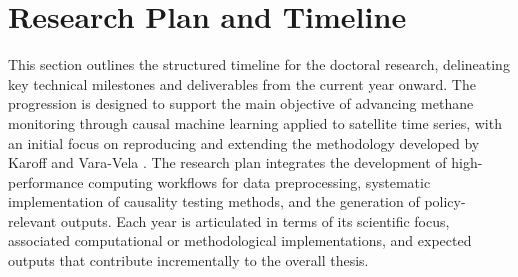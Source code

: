 
\cleardoublepage
\label{chap:evaluation}

\section{Research Plan and Timeline}

This section outlines the structured timeline for the doctoral research, delineating key technical milestones and deliverables from the current year onward. The progression is designed to support the main objective of advancing methane monitoring through causal machine learning applied to satellite time series, with an initial focus on reproducing and extending the methodology developed by Karoff and Vara-Vela \cite{Karoff2023}. The research plan integrates the development of high-performance computing workflows for data preprocessing, systematic implementation of causality testing methods, and the generation of policy-relevant outputs. Each year is articulated in terms of its scientific focus, associated computational or methodological implementations, and expected outputs that contribute incrementally to the overall thesis.


